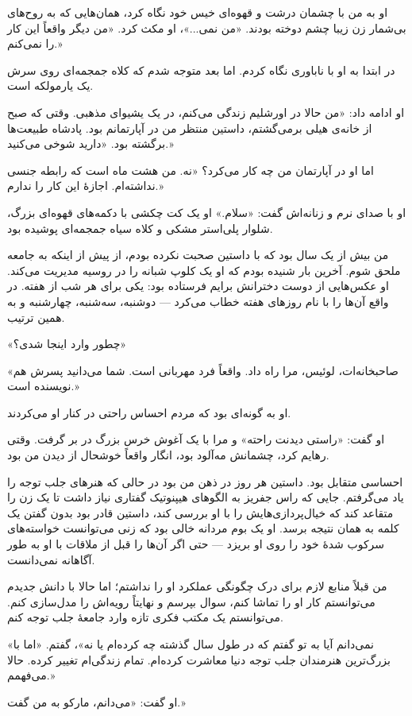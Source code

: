 او به من با چشمان درشت و قهوه‌ای خیس خود نگاه کرد، همان‌هایی که به روح‌های بی‌شمار زن زیبا چشم دوخته بودند. «من نمی‌...»، او مکث کرد. «من دیگر واقعاً این کار را نمی‌کنم.»

در ابتدا به او با ناباوری نگاه کردم. اما بعد متوجه شدم که کلاه جمجمه‌ای روی سرش یک یارمولکه است.

او ادامه داد: «من حالا در اورشلیم زندگی می‌کنم، در یک یشیوای مذهبی. وقتی که صبح از خانه‌ی هیلی برمی‌گشتم، داستین منتظر من در آپارتمانم بود. پادشاه طبیعت‌ها برگشته بود. «دارید شوخی می‌کنید.»

اما او در آپارتمان من چه کار می‌کرد؟ «نه. من هشت ماه است که رابطه جنسی نداشته‌ام. اجازۀ این کار را ندارم.»

او با صدای نرم و زنانه‌اش گفت: «سلام.» او یک کت چکشی با دکمه‌های قهوه‌ای بزرگ، شلوار پلی‌استر مشکی و کلاه سیاه جمجمه‌ای پوشیده بود. 

من بیش از یک سال بود که با داستین صحبت نکرده بودم، از پیش از اینکه به جامعه ملحق شوم. آخرین بار شنیده بودم که او یک کلوپ شبانه را در روسیه مدیریت می‌کند. او عکس‌هایی از دوست دخترانش برایم فرستاده بود: یکی برای هر شب از هفته. در واقع آن‌ها را با نام روز‌های هفته خطاب می‌کرد — دوشنبه، سه‌شنبه، چهارشنبه و به همین ترتیب.

«چطور وارد اینجا شدی؟»

«صاحبخانه‌ات، لوئیس، مرا راه داد. واقعاً فرد مهربانی است. شما می‌دانید پسرش هم نویسنده است.»

او به گونه‌ای بود که مردم احساس راحتی در کنار او می‌کردند.

او گفت: «راستی دیدنت راحته» و مرا با یک آغوش خرس بزرگ در بر گرفت. وقتی رهایم کرد، چشمانش مه‌آلود بود، انگار واقعاً خوشحال از دیدن من بود.

احساسی متقابل بود. داستین هر روز در ذهن من بود در حالی که هنر‌های جلب توجه را یاد می‌گرفتم. جایی که راس جفریز به الگوهای هیپنوتیک گفتاری نیاز داشت تا یک زن را متقاعد کند که خیال‌پردازی‌هایش را با او بررسی کند، داستین قادر بود بدون گفتن یک کلمه به همان نتیجه برسد. او یک بوم مردانه خالی بود که زنی می‌توانست خواسته‌های سرکوب شدۀ خود را روی او بریزد — حتی اگر آن‌ها را قبل از ملاقات با او به طور آگاهانه نمی‌دانست.

من قبلاً منابع لازم برای درک چگونگی عملکرد او را نداشتم؛ اما حالا با دانش جدیدم می‌توانستم کار او را تماشا کنم، سوال بپرسم و نهایتاً رویه‌اش را مدل‌سازی کنم. می‌توانستم یک مکتب فکری تازه وارد جامعۀ جلب توجه کنم.

«نمی‌دانم آیا به تو گفتم که در طول سال گذشته چه کرده‌ام یا نه»، گفتم. «اما با بزرگ‌ترین هنرمندان جلب توجه دنیا معاشرت کرده‌ام. تمام زندگی‌ام تغییر کرده. حالا می‌فهمم.»

او گفت: «می‌دانم، مارکو به من گفت.»